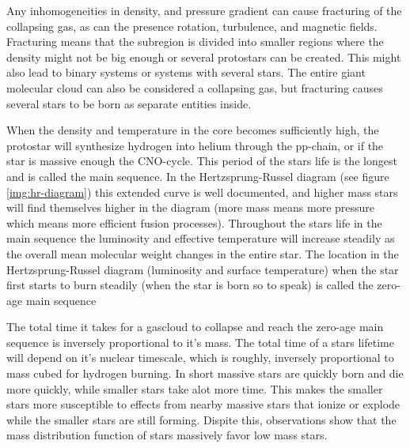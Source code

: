 Any inhomogeneities in density, and pressure gradient can cause fracturing of the collapsing gas, as can the presence rotation, turbulence, and magnetic fields.
Fracturing means that the subregion is divided into smaller regions where the density might not be big enough or several protostars can be created.
This might also lead to binary systems or systems with several stars.
The entire giant molecular cloud can also be considered a collapsing gas, but fracturing causes several stars to be born as separate entities inside.

When the density and temperature in the core becomes sufficiently high, the protostar will synthesize hydrogen into helium through the pp-chain, or if the star is massive enough the CNO-cycle.
This period of the stars life is the longest and is called the main sequence.
In the Hertzsprung-Russel diagram (see figure \ref{img:hr-diagram}) this extended curve is well documented, and higher mass stars will find themselves higher in the diagram (more mass means more pressure which means more efficient fusion processes).
Throughout the stars life in the main sequence the luminosity and effective temperature will increase steadily as the overall mean molecular weight changes in the entire star.
The location in the Hertzsprung-Russel diagram (luminosity and surface temperature) when the star first starts to burn steadily (when the star is born so to speak) is called the zero-age main sequence

The total time it takes for a gascloud to collapse and reach the zero-age main sequence is inversely proportional to it's mass.
The total time of a stars lifetime will depend on it's nuclear timescale, which is roughly, inversely proportional to mass cubed for hydrogen burning.
In short massive stars are quickly born and die more quickly, while smaller stars take alot more time. This makes the smaller stars more susceptible to effects from nearby massive stars that ionize or explode while the smaller stars are still forming.
Dispite this, observations show that the mass distribution function of stars massively favor low mass stars.


